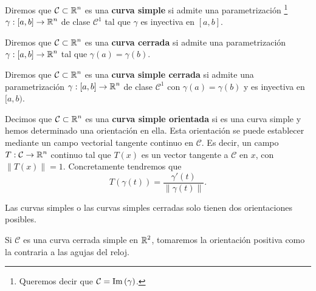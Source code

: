 \begin{definition}
	Diremos que $\displaystyle \mathcal{C}\subset \mathbb{R}^{n} $ es una \textbf{curva simple} si admite una parametrización \footnote{Queremos decir que $\displaystyle \mathcal{C}=\operatorname{Im}\left(\gamma \right) $.} $\displaystyle \gamma: \left[a,b\right] \to \mathbb{R}^{n} $ de clase $\displaystyle \mathcal{C}^{1} $ tal que $\displaystyle \gamma  $ es inyectiva en $\displaystyle \left[a,b\right]  $. 
\end{definition}
\begin{definition}
	Diremos que $\displaystyle \mathcal{C}\subset \mathbb{R}^{n} $ es una \textbf{curva cerrada} si admite una parametrización $\displaystyle \gamma:\left[a,b\right] \to \mathbb{R}^{n} $ tal que $\displaystyle \gamma\left(a\right)=\gamma\left(b\right) $. 
\end{definition}
\begin{definition}
	Diremos que $\displaystyle \mathcal{C}\subset \mathbb{R}^{n} $ es una \textbf{curva simple cerrada} si admite una parametrización $\displaystyle \gamma:\left[a,b\right] \to \mathbb{R}^{n} $ de clase $\displaystyle \mathcal{C}^{1} $ con $\displaystyle \gamma\left(a\right)=\gamma\left(b\right) $ y es inyectiva en $\displaystyle [a,b) $. 
\end{definition}
\begin{definition}
Decimos que $\displaystyle \mathcal{C}\subset \mathbb{R}^{n} $ es una \textbf{curva simple orientada} si es una curva simple y hemos determinado una orientación en ella. Esta orientación se puede establecer mediante un campo vectorial tangente continuo en $\displaystyle \mathcal{C} $. 
Es decir, un campo $\displaystyle T:\mathcal{C}\to \mathbb{R}^{n} $ continuo tal que $\displaystyle T\left(x\right) $ es un vector tangente a $\displaystyle \mathcal{C} $ en $\displaystyle x $, con $\displaystyle \|T\left(x\right)\| = 1 $. Concretamente tendremos que 
\[T\left(\gamma\left(t\right)\right)=\frac{\gamma'\left(t\right)}{\|\gamma\left(t\right)\|} .\]
\end{definition}
\begin{observation}
Las curvas simples o las curvas simples cerradas solo tienen dos orientaciones posibles.
\end{observation}
\begin{notation}
Si $\displaystyle \mathcal{C} $ es una curva cerrada simple en $\displaystyle \mathbb{R}^{2} $, tomaremos la orientación positiva como la contraria a las agujas del reloj.
\end{notation}

